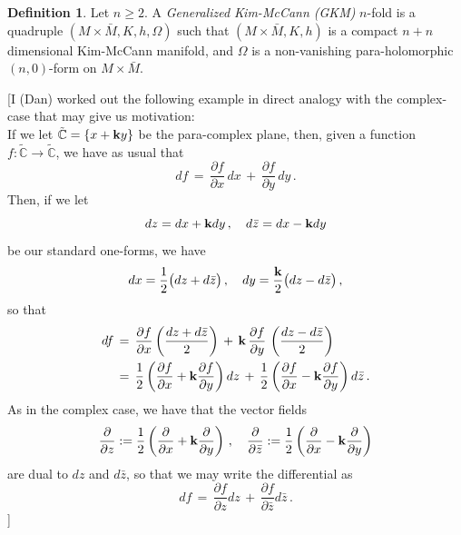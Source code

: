 \documentclass[12pt,letterpaper]{amsart}%
\newcounter{mycounter}
\numberwithin{mycounter}{section}
\theoremstyle{plain}
\numberwithin{equation}{section}
\theoremstyle{definition}
\newtheorem{definition}[mycounter]{Definition}
\newcommand{\note}[1]{\strut{\color{red}[#1]}}
\begin{document}
\begin{definition}
 Let $n\geq2$. A \textit{Generalized Kim-McCann (GKM)} $n$-fold is a
quadruple $(M \times \bar{M},K,h,\Omega)$ such that $(M \times \bar{M},K,h)$ is a compact $n+n$
dimensional Kim-McCann manifold, and $\Omega$ is a non-vanishing
para-holomorphic $(n,0)$-form on $M \times \bar{M}.$
\end{definition}
\iffalse
\noindent\note{I (Dan) worked out the following example in direct analogy with the complex-case that may give us motivation: \\

\;\;\; If we let  $\tilde{\mathbb{C}}=\{x+\textrm{\bf k}y\}$ be the para-complex plane, then, given a function $f:\tilde{\mathbb{C}}\rightarrow\tilde{\mathbb{C}}$, we have as usual that
\begin{equation*}
    df \,=\, \frac{\partial f}{\partial x}\,dx \,+\, \frac{\partial f}{\partial y}\,dy \,.
\end{equation*}
Then, if we let 
\begin{equation*}
    dz=dx+\textrm{\bf k}dy\,,\quad d\bar{z}=dx-\textrm{\bf k}dy
\end{equation*}
be our standard one-forms, we have 
\begin{equation*}
    dx=\frac{1}{2}\big(dz+d\bar{z}\big)\,, \quad dy=\frac{\textrm{\bf k}}{2}\big(dz-d\bar{z}\big)\,,
\end{equation*}
so that 
\begin{align*}
    df \,&=\, \frac{\partial f}{\partial x}\left(\frac{dz+d\bar{z}}{2}\right) \,+\, \textrm{\bf k}\,\frac{\partial f}{\partial y}\,\left(\frac{dz-d\bar{z}}{2}\right) \\
    \,&=\, \frac{1}{2}\left(\frac{\partial f}{\partial x}+\textrm{\bf k} \frac{\partial f}{\partial y}\right)dz \,+\, \frac{1}{2} \left(\frac{\partial f}{\partial x}-\textrm{\bf k} \frac{\partial f}{\partial y}\right)d\bar{z} \,.
\end{align*}
As in the complex case, we have that the vector fields
\begin{equation*}
    \frac{\partial}{\partial z} := \frac{1}{2}\left(\frac{\partial}{\partial x}+\textrm{\bf k} \frac{\partial}{\partial y}\right)\,, \quad \frac{\partial}{\partial \bar{z}} := \frac{1}{2}\left(\frac{\partial}{\partial x}-\textrm{\bf k} \frac{\partial}{\partial y}\right)
\end{equation*}
are dual to $dz$ and $d\bar{z}$, so that we may write the differential as 
\begin{equation*}
    df \,=\, \frac{\partial f}{\partial z} dz \,+\, \frac{\partial f}{\partial\bar{z}}d\bar{z}\,. 

\end{equation*}}
\end{document}
